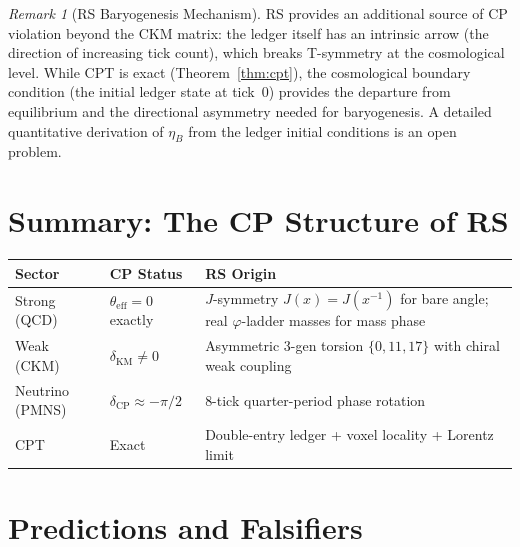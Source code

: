 \documentclass[12pt,a4paper]{article}
\theoremstyle{definition}
\theoremstyle{remark}
\newtheorem{remark}[theorem]{Remark}
\begin{document}
\begin{remark}[RS Baryogenesis Mechanism]
RS provides an additional source of CP violation beyond the CKM
matrix: the ledger itself has an intrinsic arrow (the direction
of increasing tick count), which breaks T-symmetry at the
cosmological level.  While CPT is exact
(Theorem~\ref{thm:cpt}), the cosmological boundary
condition (the initial ledger state at tick~0) provides the
departure from equilibrium and the directional asymmetry needed
for baryogenesis.  A detailed quantitative derivation of
$\eta_B$ from the ledger initial conditions is an open problem.
\end{remark}

\section{Summary: The CP Structure of RS}
\label{sec:summary}

\begin{center}
\renewcommand{\arraystretch}{1.3}
\begin{tabular}{@{}llp{7cm}@{}}
\toprule
\textbf{Sector} & \textbf{CP Status} &
\textbf{RS Origin} \\
\midrule
Strong (QCD) & $\theta_{\mathrm{eff}} = 0$ exactly &
$J$-symmetry $J(x) = J(x^{-1})$ for bare angle;
real $\varphi$-ladder masses for mass phase \\
Weak (CKM) & $\delta_{\mathrm{KM}} \neq 0$ &
Asymmetric 3-gen torsion $\{0, 11, 17\}$ with
chiral weak coupling \\
Neutrino (PMNS) & $\delta_{\mathrm{CP}} \approx -\pi/2$ &
8-tick quarter-period phase rotation \\
CPT & Exact &
Double-entry ledger + voxel locality + Lorentz
limit \\
\bottomrule
\end{tabular}
\end{center}

\section{Predictions and Falsifiers}
\label{sec:predictions}
\end{document}
